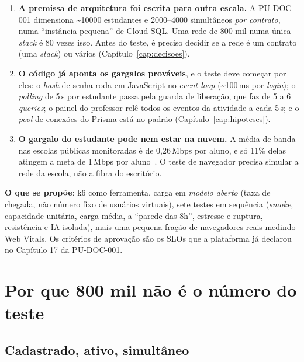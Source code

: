 \documentclass[11pt, a4paper, oneside, openany]{report}
\begin{document}
\begin{enumerate}
  \item \textbf{A premissa de arquitetura foi escrita para outra escala.} A
    PU-DOC-001 dimensiona \textasciitilde\num{10000} estudantes e
    \num{2000}--\num{4000} simultâneos \emph{por contrato}, numa
    \enquote{instância pequena} de Cloud SQL. Uma rede de 800 mil numa única
    \emph{stack} é 80 vezes isso. Antes do teste, é preciso decidir se a rede é
    um contrato (uma \emph{stack}) ou vários (Capítulo~\ref{cap:decisoes}).
  \item \textbf{O código já aponta os gargalos prováveis}, e o teste deve
    começar por eles: o \emph{hash} de senha roda em JavaScript no
    \emph{event loop} (\textasciitilde100\,ms por \emph{login}); o
    \emph{polling} de 5\,s por estudante passa pela guarda de liberação, que
    faz de 5 a 6 \emph{queries}; o painel do professor relê todos os eventos da
    atividade a cada 5\,s; e o \emph{pool} de conexões do Prisma está no padrão
    (Capítulo~\ref{cap:hipoteses}).
  \item \textbf{O gargalo do estudante pode nem estar na nuvem.} A média de
    banda nas escolas públicas monitoradas é de 0,26\,Mbps por aluno, e só 11\%
    delas atingem a meta de 1\,Mbps por aluno~\cite{nicbr2024}. O teste de
    navegador precisa simular a rede da escola, não a fibra do escritório.
\end{enumerate}

\textbf{O que se propõe}: k6 como ferramenta, carga em \emph{modelo aberto}
(taxa de chegada, não número fixo de usuários virtuais), sete testes em
sequência (\emph{smoke}, capacidade unitária, carga média, a \enquote{parede
das 8h}, estresse e ruptura, resistência e IA isolada), mais uma pequena
fração de navegadores reais medindo Web Vitals. Os critérios de aprovação são
os SLOs que a plataforma já declarou no Capítulo 17 da PU-DOC-001.

\chapter{Por que 800 mil não é o número do teste}
\label{cap:porque}

\section{Cadastrado, ativo, simultâneo}
\end{document}
